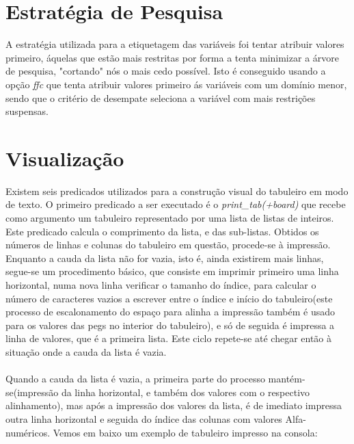 \documentclass{llncs}
\begin{document}
\section{Estrat\'{e}gia de Pesquisa}
%
A estrat\'{e}gia utilizada para a etiquetagem das vari\'{a}veis foi tentar atribuir valores primeiro, \'{a}quelas que est\~{a}o mais restritas por forma a tenta minimizar a \'{a}rvore de pesquisa, "cortando" n\'{o}s o mais cedo poss\'{i}vel. Isto \'{e} conseguido usando a op\c{c}\~{a}o \emph{ffc} que tenta atribuir valores primeiro \'{a}s vari\'{a}veis com um dom\'{i}nio menor, sendo que o crit\'{e}rio de desempate seleciona a vari\'{a}vel com mais restri\c{c}\~{o}es suspensas.


\section{Visualiza\c{c}\~{a}o}

Existem seis predicados utilizados para a construção visual do tabuleiro em modo de texto. O primeiro predicado a ser executado é o \textit{print\_tab(+board)} que recebe como argumento um tabuleiro representado por uma lista de listas de inteiros. Este predicado calcula o comprimento da lista, e das sub-listas. Obtidos os números de linhas e colunas do tabuleiro em questão, procede-se à impressão. Enquanto a cauda da lista não for vazia, isto é, ainda existirem mais linhas, segue-se um procedimento básico, que consiste em imprimir primeiro uma linha horizontal, numa nova linha verificar o tamanho do índice, para calcular o número de caracteres vazios a escrever entre o índice e início do tabuleiro(este processo de escalonamento do espaço para alinha a impressão também é usado para os valores das pegs no interior do tabuleiro), e só de seguida é impressa a linha de valores, que é a primeira lista. Este ciclo repete-se até chegar então à situação onde a cauda da lista é vazia. 
\paragraph*{}
Quando a cauda da lista é vazia, a primeira parte do processo mantém-se(impressão da linha horizontal, e também dos valores com o respectivo alinhamento), mas após a impressão dos valores da lista, é de imediato impressa outra linha horizontal e seguida do índice das colunas com valores Alfa-numéricos. 
Vemos em baixo um exemplo de tabuleiro impresso na consola:
\paragraph*{}
\end{document}

